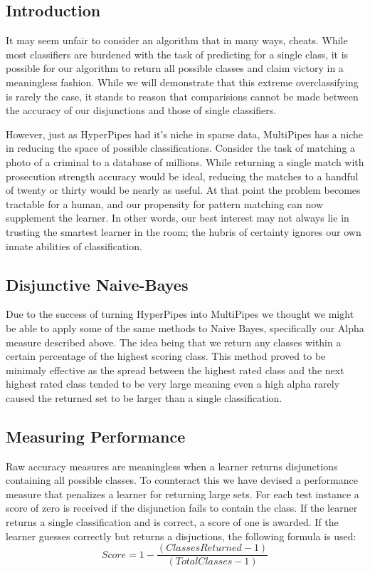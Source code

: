 \subsection{Introduction}
It may seem unfair to consider an algorithm that in many ways, cheats. While most classifiers are burdened with the task of predicting for a single class, it is possible for our algorithm to return all possible classes and claim victory in a meaningless fashion. While we will demonstrate that this extreme overclassifying is rarely the case, it stands to reason that comparisions cannot be made between the accuracy of our disjunctions and those of single classifiers.

However, just as HyperPipes had it's niche in sparse data, MultiPipes has a niche in reducing the space of possible classifications. Consider the task of matching a photo of a criminal to a database of millions. While returning a single match with prosecution strength accuracy would be ideal, reducing the matches to a handful of twenty or thirty would be nearly as useful. At that point the problem becomes tractable for a human, and our propensity for pattern matching can now supplement the learner. In other words, our best interest may not always lie in trusting the smartest learner in the room; the hubris of certainty ignores our own innate abilities of classification.

\subsection{Disjunctive Naive-Bayes}
Due to the success of turning HyperPipes into MultiPipes we thought we might be able to apply some of the same methods to Naive Bayes, specifically our Alpha measure described above. The idea being that we return any classes within a certain percentage of the highest scoring class. This method proved to be minimaly effective as the spread between the highest rated class and the next highest rated class tended to be very large meaning even a high alpha rarely caused the returned set to be larger than a single classification. 
\subsection{Measuring Performance}
Raw accuracy measures are meaningless when a learner returns disjunctions containing all possible classes. To counteract this we have devised a performance measure that penalizes a learner for returning large sets. For each test instance a score of zero is received if the disjunction fails to contain the class. If the learner returns a single classification and is correct, a score of one is awarded. If the learner guesses correctly but returns a disjuctions, the following formula is used:
\begin{equation}
Score = 1 - \frac{(ClassesReturned - 1)}{(TotalClasses - 1)}
\end{equation}

